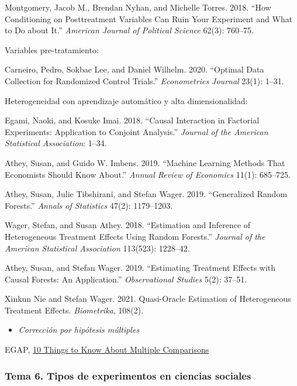 \documentclass[
  12pt,
]{article}
\providecommand{\tightlist}{%
  \setlength{\itemsep}{0pt}\setlength{\parskip}{0pt}}
\begin{document}
Montgomery, Jacob M., Brendan Nyhan, and Michelle Torres. 2018. ``How
Conditioning on Posttreatment Variables Can Ruin Your Experiment and
What to Do about It.'' \emph{American Journal of Political Science}
62(3): 760--75.

Variables pre-tratamiento:

Carneiro, Pedro, Sokbae Lee, and Daniel Wilhelm. 2020. ``Optimal Data
Collection for Randomized Control Trials.'' \emph{Econometrics Journal}
23(1): 1--31.

Heterogeneidad con aprendizaje automático y alta dimensionalidad:

Egami, Naoki, and Kosuke Imai. 2018. ``Causal Interaction in Factorial
Experiments: Application to Conjoint Analysis.'' \emph{Journal of the
American Statistical Association}: 1--34.

Athey, Susan, and Guido W. Imbens. 2019. ``Machine Learning Methods That
Economists Should Know About.'' \emph{Annual Review of Economics} 11(1):
685--725.

Athey, Susan, Julie Tibshirani, and Stefan Wager. 2019. ``Generalized
Random Forests.'' \emph{Annals of Statistics} 47(2): 1179--1203.

Wager, Stefan, and Susan Athey. 2018. ``Estimation and Inference of
Heterogeneous Treatment Effects Using Random Forests.'' \emph{Journal of
the American Statistical Association} 113(523): 1228--42.

Athey, Susan, and Stefan Wager. 2019. ``Estimating Treatment Effects
with Causal Forests: An Application.'' \emph{Observational Studies}
5(2): 37--51.

Xinkun Nie and Stefan Wager. 2021. Quasi-Oracle Estimation of
Heterogeneous Treatment Effects. \emph{Biometrika}, 108(2).

\begin{itemize}
\tightlist
\item
  \emph{Corrección por hipótesis múltiples}
\end{itemize}

EGAP,
\href{https://egap.org/resource/10-things-to-know-about-multiple-comparisons/}{10
Things to Know About Multiple Comparisons}

\hypertarget{tema-6.-tipos-de-experimentos-en-ciencias-sociales}{%
\subsubsection{Tema 6. Tipos de experimentos en ciencias
sociales}\label{tema-6.-tipos-de-experimentos-en-ciencias-sociales}}
\end{document}
